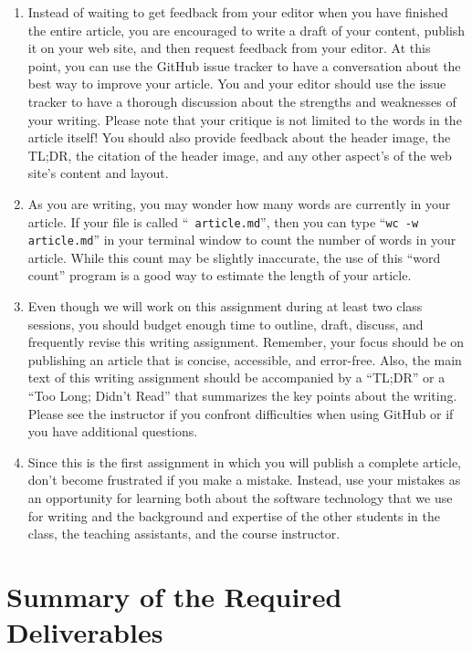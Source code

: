 \begin{enumerate}
  \item Instead of waiting to get feedback from your editor when you have finished the entire article, you are
    encouraged to write a draft of your content, publish it on your web site, and then request feedback from your
    editor. At this point, you can use the GitHub issue tracker to have a conversation about the best way to improve
    your article. You and your editor should use the issue tracker to have a thorough discussion about the strengths and
    weaknesses of your writing. Please note that your critique is not limited to the words in the article itself! You
    should also provide feedback about the header image, the TL;DR, the citation of the header image, and any other
    aspect's of the web site's content and layout.

  \item As you are writing, you may wonder how many words are currently in your article. If your file is called ``{\tt
    article.md}'', then you can type ``{\tt wc -w article.md}'' in your terminal window to count the number of words in
    your article. While this count may be slightly inaccurate, the use of this ``word count'' program is a good way to
    estimate the length of your article.

  \item Even though we will work on this assignment during at least two class sessions, you should budget enough time to
    outline, draft, discuss, and frequently revise this writing assignment. Remember, your focus should be on publishing
    an article that is concise, accessible, and error-free. Also, the main text of this writing assignment should be
    accompanied by a ``TL;DR'' or a ``Too Long; Didn't Read'' that summarizes the key points about the writing. Please
    see the instructor if you confront difficulties when using GitHub or if you have additional questions.

  \item Since this is the first assignment in which you will publish a complete article, don't become frustrated if you
    make a mistake. Instead, use your mistakes as an opportunity for learning both about the software technology that we
    use for writing and the background and expertise of the other students in the class, the teaching assistants, and
    the course instructor.

\end{enumerate}

\vspace*{-.15in}
\section*{Summary of the Required Deliverables}

